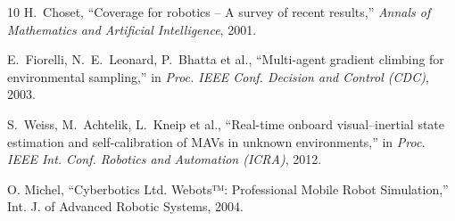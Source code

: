 \documentclass[lettersize,journal]{IEEEtran}
\begin{document}
\begin{thebibliography}{10}
H.~Choset, ``Coverage for robotics – A survey of recent results,'' 
\textit{Annals of Mathematics and Artificial Intelligence}, 2001.

E.~Fiorelli, N.~E.~Leonard, P.~Bhatta et al., ``Multi-agent gradient climbing for environmental sampling,'' 
in \textit{Proc. IEEE Conf. Decision and Control (CDC)}, 2003.

S.~Weiss, M.~Achtelik, L.~Kneip et al., 
``Real-time onboard visual–inertial state estimation and self-calibration of MAVs in unknown environments,'' 
in \textit{Proc. IEEE Int. Conf. Robotics and Automation (ICRA)}, 2012.

O. Michel, “Cyberbotics Ltd. Webots™: Professional Mobile Robot Simulation,”
Int. J. of Advanced Robotic Systems, 2004.



\end{thebibliography}





\vfill
\end{document}

